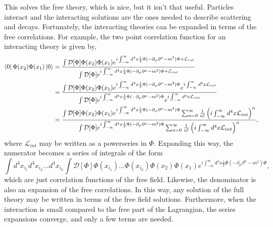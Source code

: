 This solves the free theory, which is nice, but it isn't that useful. Particles interact and the interacting solutions are the ones needed to describe scattering and decays. Fortunately, the interacting theories can be expanded in terms of the free correlations. For example, the two point correlation function for an interacting theory is given by,
\begin{equation}
\begin{split}
\bra{0}\Phi(x_2)\Phi(x_1)\ket{0} &= 
\frac{\int \mathcal{D}[\Phi]\Phi(x_2)\Phi(x_1)e^{i\int_{-\infty}^{\infty} d^4x \frac{1}{2}\Phi (-\partial_\mu\partial^\mu - m^2)\Phi + \mathcal{L}_{int}}}
{\int \mathcal{D}[\Phi]e^{i\int_{-\infty}^{\infty} d^4x \frac{1}{2}\Phi (-\partial_\mu\partial^\mu - m^2)\Phi + \mathcal{L}_{int}}} \\
&= \frac{\int \mathcal{D}[\Phi]\Phi(x_2)\Phi(x_1)
e^{i\int_{-\infty}^{\infty} d^4x \frac{1}{2}\Phi (-\partial_\mu\partial^\mu - m^2)\Phi} e^{i\int_{-\infty}^{\infty} d^4x \mathcal{L}_{int}}}
{\int \mathcal{D}[\Phi]e^{i\int_{-\infty}^{\infty} d^4x \frac{1}{2}\Phi (-\partial_\mu\partial^\mu - m^2)\Phi}  e^{i\int_{-\infty}^{\infty} d^4x \mathcal{L}_{int}}} \\
&= \frac{\int \mathcal{D}[\Phi]\Phi(x_2)\Phi(x_1)
e^{i\int_{-\infty}^{\infty} d^4x \frac{1}{2}\Phi (-\partial_\mu\partial^\mu - m^2)\Phi} \sum_{n=0}^{\infty} \frac{1}{n!}\left(i\int_{-\infty}^{\infty} d^4x \mathcal{L}_{int}\right)^n}
{\int \mathcal{D}[\Phi]e^{i\int_{-\infty}^{\infty} d^4x \frac{1}{2}\Phi (-\partial_\mu\partial^\mu - m^2)\Phi} \sum_{n=0}^{\infty} \frac{1}{n!}\left(i\int_{-\infty}^{\infty} d^4x \mathcal{L}_{int}\right)^n }, \\
\end{split}
\end{equation}
where $\mathcal{L}_{int}$ may be written as a powerseries in $\Phi$. Expanding this way, the numerator becomes a series of integrals of the form
\begin{equation}
\int d^4x_{i_1}d^4x_{i_2} ... d^4x_{i_k} \int \mathcal{D}[\Phi]\Phi(x_{i_1})...\Phi(x_{i_k})\Phi(x_2)\Phi(x_1)e^{i\int_{-\infty}^{\infty} d^4x \frac{1}{2}\Phi (-\partial_\mu\partial^\mu - m^2)\Phi},
\end{equation} 
which are just correlation functions of the free field. Likewise, the denominator is also an expansion of the free correlations. In this way, any solution of the full theory may be written in terms of the free field solutions. Furthermore, when the interaction is small compared to the free part of the Lagrangian, the series expansions converge, and only a few terms are needed.   

